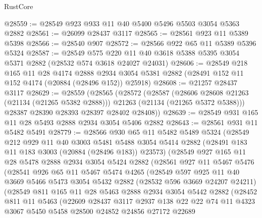 \begin{lexlean}{RustCore}
\begin{coremodule}
@28559 := @28549 @923 @933 @11 @40 @5400 @5496 @5503 @3054 @5363 @2882
@28561 := @26099 @28437 @3117
@28565 := @28561 @923 @11 @5389 @5398
@28566 := @28540 @907
@28572 := @28566 @922 @65 @11 @5389 @5396 @5324
@28587 := @28549
    @575
    @220
    @11
    @40
    @3618
    @5388
    @5395
    @3054
    @5371
    @2882
    (@28532 @574 @3618 @24027 @24031)
@28606 := @28549
    @218
    @165
    @11
    @28
    @4174
    @2888
    @2934
    @3054
    @5381
    @2882
    (@28491 @152 @11 @152 @4174 (@20884 (@28496 @152)) @25918)
@28608 := @21257 @28437 @3117
@28629 := @28559
    (@28565
      (@28572
        (@28587
          (@28606 @28608 @21263 (@21134 (@21265 @5382 @2888)))
          @21263
          (@21134 (@21265 @5372 @5388)))
        @28387
        @28390
        @28393
        @28397
        @28402
        @28408))
@28639 := @28549 @931 @165 @11 @28 @5493 @2888 @2934 @3054 @5406 @2882
@28643 := @28561 @931 @11 @5482 @5491
@28779 := @28566
    @930
    @65
    @11
    @5482
    @5489
    @5324
    (@28549
      @212
      @929
      @11
      @40
      @3003
      @5481
      @5488
      @3054
      @5414
      @2882
      (@28491 @183 @11 @183 @3003 (@20884 (@28496 @183)) @23573)
      (@28549
        @927
        @165
        @11
        @28
        @5478
        @2888
        @2934
        @3054
        @5424
        @2882
        (@28561
          @927
          @11
          @5467
          @5476
          (@28541
            @926
            @65
            @11
            @5467
            @5474
            @4265
            (@28549
              @597
              @925
              @11
              @40
              @3669
              @5466
              @5473
              @3054
              @5432
              @2882
              (@28532 @596 @3669 @24207 @24211)
              (@28549
                @811
                @165
                @11
                @28
                @5463
                @2888
                @2934
                @3054
                @5442
                @2882
                (@28452
                  @811
                  @11
                  @5463
                  (@22609
                    @28437
                    @3117
                    @2937
                    @138
                    @22
                    @22
                    @74
                    @11
                    @4323
                    @3067
                    @5450
                    @5458
                    @28500
                    @24852
                    @24856
                    @27172
                    @22689

\end{coremodule}
\end{lexlean}
